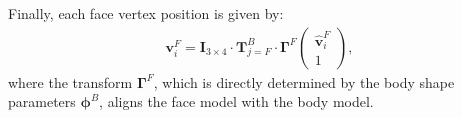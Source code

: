 Finally, each face vertex position is given by:
\begin{align}
\mathbf{v}^F_i = \mathbf{I}_{3\times 4} \cdot \mathbf{T}^B_{j=F} \cdot \bm{\Gamma}^F \begin{pmatrix} \hat{\mathbf{v}}^F_i \\ 1 \end{pmatrix},
\label{eq:face_pose}
\end{align}
where the transform $\bm{\Gamma}^F$, which is directly determined by the body shape parameters $\boldsymbol{\phi}^B$, aligns the face model with the body model.

%
